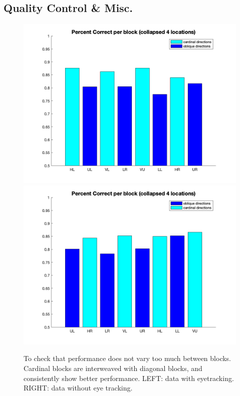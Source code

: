 \documentclass[11pt]{article} %
\begin{document}
\subsection{Quality Control \& Misc.}
\begin{figure}[H]
\centering %
\includegraphics[scale=.15]{Images/block_performance_new.png}
\includegraphics[scale=.15]{Images/block_performance.png}
\caption{To check that performance does not vary too much between blocks. Cardinal blocks are interweaved with diagonal blocks, and consistently show better performance. LEFT:  data with eyetracking. RIGHT: data without eye tracking.}
\end{figure}
\end{document}
